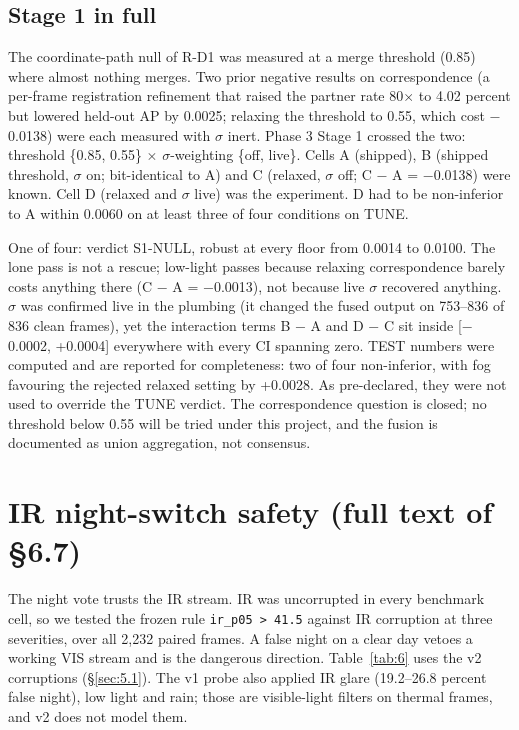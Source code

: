 \documentclass[10pt]{article}
\begin{document}
\subsection{Stage 1 in full}\label{app:H.3}
The coordinate-path null of R-D1 was measured at a merge threshold (0.85) where almost nothing merges. Two prior negative results on correspondence (a per-frame registration refinement that raised the partner rate 80$\times$ to 4.02 percent but lowered held-out AP by 0.0025; relaxing the threshold to 0.55, which cost $-$0.0138) were each measured with $\sigma$ inert. Phase 3 Stage 1 crossed the two: threshold \{0.85, 0.55\} $\times$ $\sigma$-weighting \{off, live\}. Cells A (shipped), B (shipped threshold, $\sigma$ on; bit-identical to A) and C (relaxed, $\sigma$ off; C $-$ A = $-$0.0138) were known. Cell D (relaxed and $\sigma$ live) was the experiment. D had to be non-inferior to A within 0.0060 on at least three of four conditions on TUNE.

One of four: verdict S1-NULL, robust at every floor from 0.0014 to 0.0100. The lone pass is not a rescue; low-light passes because relaxing correspondence barely costs anything there (C $-$ A = $-$0.0013), not because live $\sigma$ recovered anything. $\sigma$ was confirmed live in the plumbing (it changed the fused output on 753--836 of 836 clean frames), yet the interaction terms B $-$ A and D $-$ C sit inside [$-$0.0002, +0.0004] everywhere with every CI spanning zero. TEST numbers were computed and are reported for completeness: two of four non-inferior, with fog favouring the rejected relaxed setting by +0.0028. As pre-declared, they were not used to override the TUNE verdict. The correspondence question is closed; no threshold below 0.55 will be tried under this project, and the fusion is documented as union aggregation, not consensus.

\FloatBarrier
\section{IR night-switch safety (full text of \S6.7)}\label{app:I}
The night vote trusts the IR stream. IR was uncorrupted in every benchmark cell, so we tested the frozen rule \texttt{ir\_\allowbreak{}p05 > 41.5} against IR corruption at three severities, over all 2,232 paired frames. A false night on a clear day vetoes a working VIS stream and is the dangerous direction. Table~\ref{tab:6} uses the v2 corruptions (\S\ref{sec:5.1}). The v1 probe also applied IR glare (19.2--26.8 percent false night), low light and rain; those are visible-light filters on thermal frames, and v2 does not model them.
\end{document}
